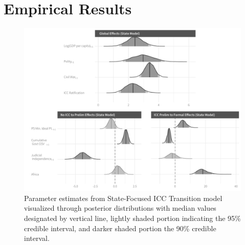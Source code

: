 
\section*{Empirical Results}

\begin{figure}
    \centering
    \includegraphics[width=1\textwidth]{stateCoefSumm.pdf}
    \caption{Parameter estimates from State-Focused ICC Transition model visualized through posterior distributions with median values designated by vertical line, lightly shaded portion indicating the 95\% credible interval, and darker shaded portion the 90\% credible interval.}
    \label{fig:stateModel}
\end{figure}

